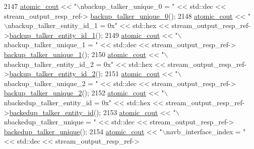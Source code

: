 \begin{DoxyCode}
2147             \hyperlink{cmd__line_8h_a0bc38ccc65c79ba06c6fcd7b4bf554c3}{atomic\_cout} << \textcolor{stringliteral}{"\(\backslash\)nbackup\_talker\_unique\_0 = "} << std::dec << stream\_output\_resp\_ref->
      \hyperlink{classavdecc__lib_1_1stream__output__descriptor__response_acae31dc43b38d6c49acb2db4c8c23b8c}{backup\_talker\_unique\_0}();
2148             \hyperlink{cmd__line_8h_a0bc38ccc65c79ba06c6fcd7b4bf554c3}{atomic\_cout} << \textcolor{stringliteral}{"\(\backslash\)nbackup\_talker\_entity\_id\_1 = 0x"} << std::hex << 
      stream\_output\_resp\_ref->\hyperlink{classavdecc__lib_1_1stream__output__descriptor__response_af3e6b600303fa7833e2033ee228c751a}{backup\_talker\_entity\_id\_1}();
2149             \hyperlink{cmd__line_8h_a0bc38ccc65c79ba06c6fcd7b4bf554c3}{atomic\_cout} << \textcolor{stringliteral}{"\(\backslash\)nbackup\_talker\_unique\_1 = "} << std::dec << stream\_output\_resp\_ref->
      \hyperlink{classavdecc__lib_1_1stream__output__descriptor__response_a99963ab0e34ebf72203e8d20e8de1ab1}{backup\_talker\_unique\_1}();
2150             \hyperlink{cmd__line_8h_a0bc38ccc65c79ba06c6fcd7b4bf554c3}{atomic\_cout} << \textcolor{stringliteral}{"\(\backslash\)nbackup\_talker\_entity\_id\_2 = 0x"} << std::hex << 
      stream\_output\_resp\_ref->\hyperlink{classavdecc__lib_1_1stream__output__descriptor__response_a76daa1a16a93fd2abd3613bea816af5f}{backup\_talker\_entity\_id\_2}();
2151             \hyperlink{cmd__line_8h_a0bc38ccc65c79ba06c6fcd7b4bf554c3}{atomic\_cout} << \textcolor{stringliteral}{"\(\backslash\)nbackup\_talker\_unique\_2 = "} << std::dec << stream\_output\_resp\_ref->
      \hyperlink{classavdecc__lib_1_1stream__output__descriptor__response_a6c91e59896d8e1d08c3cf676a78caa53}{backup\_talker\_unique\_2}();
2152             \hyperlink{cmd__line_8h_a0bc38ccc65c79ba06c6fcd7b4bf554c3}{atomic\_cout} << \textcolor{stringliteral}{"\(\backslash\)nbackedup\_talker\_entity\_id = 0x"} << std::hex << 
      stream\_output\_resp\_ref->\hyperlink{classavdecc__lib_1_1stream__output__descriptor__response_ae7d527febcff1dc1fa228cc197cf8e44}{backedup\_talker\_entity\_id}();
2153             \hyperlink{cmd__line_8h_a0bc38ccc65c79ba06c6fcd7b4bf554c3}{atomic\_cout} << \textcolor{stringliteral}{"\(\backslash\)nbackedup\_talker\_unique = "} << std::dec << stream\_output\_resp\_ref->
      \hyperlink{classavdecc__lib_1_1stream__output__descriptor__response_a76c462953d0e3431cba9efb6d8ae5a87}{backedup\_talker\_unique}();
2154             \hyperlink{cmd__line_8h_a0bc38ccc65c79ba06c6fcd7b4bf554c3}{atomic\_cout} << \textcolor{stringliteral}{"\(\backslash\)navb\_interface\_index = "} << std::dec << stream\_output\_resp\_ref->

\end{DoxyCode}
